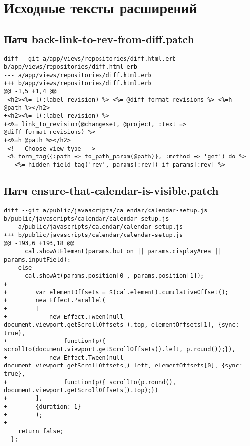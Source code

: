\appendix

\makeatletter
\gdef\thechapter{\@Asbuk\c@chapter}
\makeatother

\chapter{Исходные тексты расширений}

\section{Патч back-link-to-rev-from-diff.patch}
\label{appendix:back-link-to-rev-from-diff.patch}
\begin{lstlisting}
diff --git a/app/views/repositories/diff.html.erb b/app/views/repositories/diff.html.erb
--- a/app/views/repositories/diff.html.erb
+++ b/app/views/repositories/diff.html.erb
@@ -1,5 +1,4 @@
-<h2><%= l(:label_revision) %> <%= @diff_format_revisions %> <%=h @path %></h2>
+<h2><%= l(:label_revision) %> 
+<%= link_to_revision(@changeset, @project, :text => @diff_format_revisions) %> 
+<%=h @path %></h2>
 <!-- Choose view type -->
 <% form_tag({:path => to_path_param(@path)}, :method => 'get') do %>
   <%= hidden_field_tag('rev', params[:rev]) if params[:rev] %>
\end{lstlisting}


\section{Патч ensure-that-calendar-is-visible.patch}
\label{appendix:ensure-that-calendar-is-visible.patch}
\begin{lstlisting}
diff --git a/public/javascripts/calendar/calendar-setup.js b/public/javascripts/calendar/calendar-setup.js
--- a/public/javascripts/calendar/calendar-setup.js
+++ b/public/javascripts/calendar/calendar-setup.js
@@ -193,6 +193,18 @@
      cal.showAtElement(params.button || params.displayArea || params.inputField);
    else
      cal.showAt(params.position[0], params.position[1]);
+
+        var elementOffsets = $(cal.element).cumulativeOffset();
+        new Effect.Parallel(
+        [
+            new Effect.Tween(null, document.viewport.getScrollOffsets().top, elementOffsets[1], {sync: true},
+                function(p){ scrollTo(document.viewport.getScrollOffsets().left, p.round());}),
+            new Effect.Tween(null, document.viewport.getScrollOffsets().left, elementOffsets[0], {sync: true},
+                function(p){ scrollTo(p.round(), document.viewport.getScrollOffsets().top);})
+        ],
+        {duration: 1}
+        );
+
    return false;
  };
\end{lstlisting}

